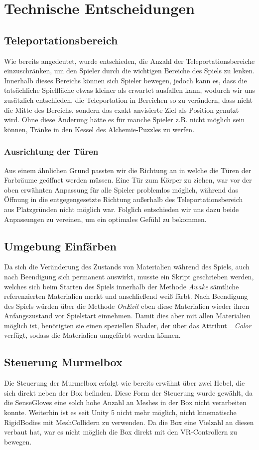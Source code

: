 \section{Technische Entscheidungen}
\subsection{Teleportationsbereich}
Wie bereits angedeutet, wurde entschieden, die Anzahl der Teleportationsbereiche einzuschränken, um den Spieler durch die wichtigen Bereiche des Spiels zu lenken. Innerhalb dieses Bereichs können sich Spieler bewegen, jedoch kann es, dass die tatsächliche Spielfläche etwas kleiner als erwartet ausfallen kann, wodurch wir uns zusätzlich entschieden, die Teleportation in Bereichen so zu verändern, dass nicht die Mitte des Bereichs, sondern das exakt anvisierte Ziel als Position genutzt wird. Ohne diese Änderung hätte es für manche Spieler z.B. nicht möglich sein können, Tränke in den Kessel des Alchemie-Puzzles zu werfen.
\subsubsection{Ausrichtung der Türen}
Aus einem ähnlichen Grund passten wir die Richtung an in welche die Türen der Farbräume geöffnet werden müssen. Eine Tür zum Körper zu ziehen, war vor der oben erwähnten Anpassung für alle Spieler problemlos möglich, während das Öffnung in die entgegengesetzte Richtung außerhalb des Teleportationsbereich aus Platzgründen nicht möglich war. Folglich entschieden wir uns dazu beide Anpassungen zu vereinen, um ein optimales Gefühl zu bekommen.
\subsection{Umgebung Einfärben}
Da sich die Veränderung des Zustands von Materialien während des Spiels, auch nach Beendigung sich permanent auswirkt, musste ein Skript geschrieben werden, welches sich beim Starten des Spiels innerhalb der Methode \textit{Awake} sämtliche referenzierten Materialien merkt und anschließend weiß färbt. Nach Beendigung des Spiels würden über die Methode \textit{OnExit} eben diese Materialien wieder ihren Anfangszustand vor Spielstart einnehmen. Damit dies aber mit allen Materialien möglich ist, benötigten sie einen speziellen Shader, der über das Attribut \textit{\_Color} verfügt, sodass die Materialien umgefärbt werden können.
\subsection{Steuerung Murmelbox}
Die Steuerung der Murmelbox erfolgt wie bereits erwähnt über zwei Hebel, die sich direkt neben der Box befinden. Diese Form der Steuerung wurde gewählt, da die SenseGloves eine solch hohe Anzahl an Meshes in der Box nicht verarbeiten konnte. Weiterhin ist es seit Unity 5 nicht mehr möglich, nicht kinematische RigidBodies mit MeshCollidern zu verwenden. Da die Box eine Vielzahl an diesen verbaut hat, war es nicht möglich die Box direkt mit den VR-Controllern zu bewegen.
